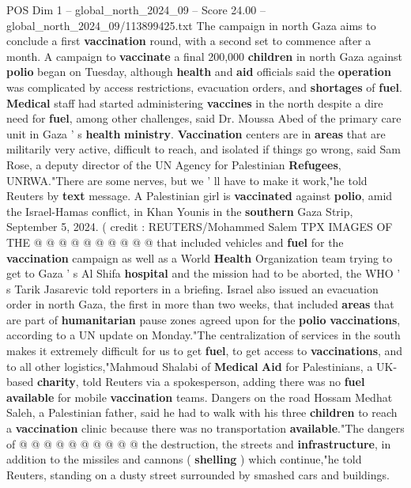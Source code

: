 \begin{textsample}{POS Dim 1 – global\_north\_2024\_09 – Score 24.00 – global\_north\_2024\_09/113899425.txt}  \label{ex:f1_pos_429}
The campaign in north Gaza aims to conclude a first \textbf{vaccination} round, with a second set to commence after a month.
A campaign to \textbf{vaccinate} a final 200,000 \textbf{children} in north Gaza against \textbf{polio} began on Tuesday, although \textbf{health} and \textbf{aid} officials said the \textbf{operation} was complicated by access restrictions, evacuation orders, and \textbf{shortages} of \textbf{fuel}. \textbf{Medical} staff had started administering \textbf{vaccines} in the north despite a dire need for \textbf{fuel}, among other challenges, said Dr.
Moussa Abed of the primary care unit in Gaza ' s \textbf{health} \textbf{ministry}. \textbf{Vaccination} centers are in \textbf{areas} that are militarily very active, difficult to reach, and isolated if things go wrong, said Sam Rose, a deputy director of the UN Agency for Palestinian \textbf{Refugees}, UNRWA."There are some nerves, but we ' ll have to make it work,"he told Reuters by \textbf{text} message.
A Palestinian girl is \textbf{vaccinated} against \textbf{polio}, amid the Israel-Hamas conflict, in Khan Younis in the \textbf{southern} Gaza Strip, September 5, 2024. ( credit : REUTERS/Mohammed Salem TPX IMAGES OF THE @ @ @ @ @ @ @ @ @ @ that included vehicles and \textbf{fuel} for the \textbf{vaccination} campaign as well as a World \textbf{Health} Organization team trying to get to Gaza ' s Al Shifa \textbf{hospital} and the mission had to be aborted, the WHO ' s Tarik Jasarevic told reporters in a briefing.
Israel also issued an evacuation order in north Gaza, the first in more than two weeks, that included \textbf{areas} that are part of \textbf{humanitarian} pause zones agreed upon for the \textbf{polio} \textbf{vaccinations}, according to a UN update on Monday."The centralization of services in the south makes it extremely difficult for us to get \textbf{fuel}, to get access to \textbf{vaccinations}, and to all other logistics,"Mahmoud Shalabi of \textbf{Medical} \textbf{Aid} for Palestinians, a UK-based \textbf{charity}, told Reuters via a spokesperson, adding there was no \textbf{fuel} \textbf{available} for mobile \textbf{vaccination} teams.
Dangers on the road Hossam Medhat Saleh, a Palestinian father, said he had to walk with his three \textbf{children} to reach a \textbf{vaccination} clinic because there was no transportation \textbf{available}."The dangers of @ @ @ @ @ @ @ @ @ @ the destruction, the streets and \textbf{infrastructure}, in addition to the missiles and cannons ( \textbf{shelling} ) which continue,"he told Reuters, standing on a dusty street surrounded by smashed cars and buildings.

\end{textsample}
